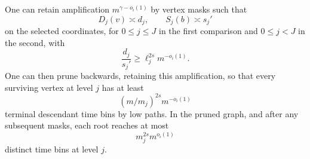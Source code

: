 \begin{lemma}\label{ext:branching}
One can retain amplification \(m^{\gamma-o_i(1)}\) by vertex masks such that
\[
                         D_j(v)\asymp d_j,\qquad
                         S_j(b)\asymp s_j'
\]
on the selected coordinates, for \(0\leq j\leq J\) in the
first comparison and \(0\leq j<J\) in the second, with
\begin{equation}\label{eq:source-38}
                         \frac{d_j}{s_j'}
                    \geq \ell_j^{2s}m^{-o_i(1)}.
\end{equation}
One can then prune backwards, retaining this amplification,
so that every surviving vertex at level \(j\)
has at least
\[
                   (m/m_j)^{2s}m^{-o_i(1)}
\]
terminal descendant time bins by low paths. In the pruned graph,
and after any subsequent masks, each root reaches at most
\begin{equation}\label{eq:source-39}
                           m_j^{2s}m^{o_i(1)}
\end{equation}
distinct time bins at level \(j\).
\end{lemma}

